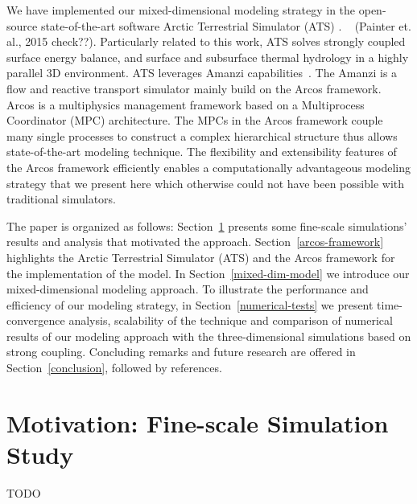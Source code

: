 \documentclass[review]{elsarticle}
\begin{document}
We have implemented our mixed-dimensional modeling strategy in the open-source state-of-the-art software Arctic Terrestrial Simulator (ATS) . 
~\cite{ecoon2016managing, spainter2016integrated} (Painter et. al., 2015 check??).  Particularly related to this work, ATS solves strongly coupled surface energy balance, and surface and subsurface thermal hydrology in a highly parallel 3D environment. ATS leverages Amanzi capabilities~\cite{moulton2012high}. The Amanzi is a flow and reactive transport simulator mainly build on the Arcos framework. Arcos is a multiphysics management framework based on a Multiprocess Coordinator (MPC) architecture.  The MPCs in the Arcos framework couple many single processes to construct a complex hierarchical structure thus allows state-of-the-art modeling technique. The flexibility and extensibility features of the Arcos framework efficiently enables a computationally advantageous modeling strategy that we present here which otherwise could not have been possible with traditional simulators.

The paper is organized as follows: Section~\ref{motivation} presents some fine-scale simulations' results and analysis that motivated the approach. Section~\ref{arcos-framework} highlights the Arctic Terrestrial Simulator (ATS) and the Arcos framework for the implementation of the model. In Section~\ref{mixed-dim-model} we introduce our mixed-dimensional modeling approach. To illustrate the performance and efficiency of our modeling strategy, in Section~\ref{numerical-tests} we present time-convergence analysis, scalability of the technique and comparison of numerical results of our modeling approach with the three-dimensional simulations based on strong coupling. Concluding remarks and future research are offered in Section~\ref{conclusion}, followed by references.


\section{Motivation: Fine-scale Simulation Study}\label{motivation}
TODO
\end{document}
